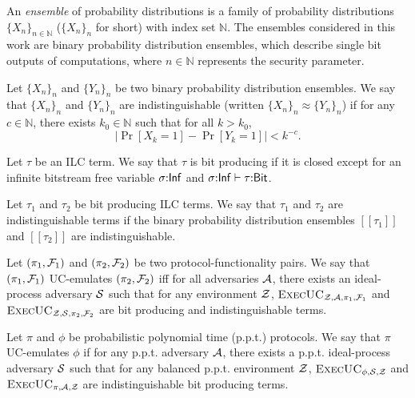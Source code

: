 \documentclass[acmsmall,review,anonymous]{acmart}\settopmatter{printfolios=true,printccs=false,printacmref=false}
\begin{document}
\begin{definition}
An \emph{ensemble} of probability distributions is a family of probability
distributions $\{ X_n \}_{n \in \mathbb{N}}$ ($\{ X_n \}_n$ for short) with index
set $\mathbb{N}$.  The ensembles considered in this work are binary probability
distribution ensembles, which describe single bit outputs of computations, where
$n \in \mathbb{N}$ represents the security parameter.
\end{definition}

\begin{definition}[Indistinguishability]
Let $\{X_n\}_n$ and $\{ Y_n \}_n$ be two binary probability distribution
ensembles. We say that $\{ X_n \}_n$ and $\{ Y_n \}_n$ are indistinguishable
(written $\{ X_n \}_n \approx \{ Y_n \}_n$) if for any $c \in \mathbb{N}$, there exists
$k_0 \in \mathbb{N}$ such that for all $k > k_0$,
\[ | \Pr[X_k = 1] - \Pr[Y_k = 1] | < k^{-c}. \]
\end{definition}

\begin{definition}
Let $\tau$ be an ILC term. We say that $\tau$ is bit producing if it is closed except
for an infinite bitstream free variable $\sigma{:}{\sf Inf}$ and $\sigma{:}{\sf Inf} \vdash
\tau{:}{\sf Bit}$.

\end{definition}

\begin{definition}
Let $\tau_1$ and $\tau_2$ be bit producing ILC terms. We say that $\tau_1$ and $\tau_2$ are
indistinguishable terms if the binary probability distribution ensembles
$[\![\tau_1]\!]$ and $[\![\tau_2]\!]$ are indistinguishable.
\end{definition}

\begin{definition}
Let $(\pi_1, \mathcal{F}_1)$ and $(\pi_2, \mathcal{F}_2)$ be two protocol-functionality
pairs. We say that $(\pi_1, \mathcal{F}_1)$ UC-emulates $(\pi_2, \mathcal{F}_2)$ iff for all
adversaries $\mathcal{A}$, there exists an ideal-process adversary $\mathcal{S}$ such that
for any environment $\mathcal{Z}$,
$\textsc{ExecUC}_{\mathcal{Z}, \mathcal{A}, \pi_1, \mathcal{F}_1}$ and
$\textsc{ExecUC}_{\mathcal{Z}, \mathcal{S}, \pi_2, \mathcal{F}_2}$ are bit producing and
indistinguishable terms.
\end{definition}

\begin{definition}
Let $\pi$ and $\phi$ be probabilistic polynomial time (p.p.t.) protocols. We say that
$\pi$ UC-emulates $\phi$ if for any p.p.t. adversary 
$\mathcal{A}$, there exists a p.p.t. ideal-process adversary $\mathcal{S}$
such that for any balanced p.p.t. environment $\mathcal{Z}$,
$\textsc{ExecUC}_{\phi, \mathcal{S}, \mathcal{Z}}$ and $\textsc{ExecUC}_{\pi, \mathcal{A}, \mathcal{Z}}$
are indistinguishable bit producing terms.
\end{definition}
\end{document}
